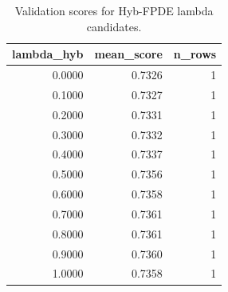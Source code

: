 \begin{table}[t]
\caption{Validation scores for Hyb-FPDE lambda candidates.}
\label{tab:lambda_distribution_computed}
\centering
\begin{tabular}{rrr}
\toprule
lambda\_hyb & mean\_score & n\_rows \\
\midrule
0.0000 & 0.7326 & 1 \\
0.1000 & 0.7327 & 1 \\
0.2000 & 0.7331 & 1 \\
0.3000 & 0.7332 & 1 \\
0.4000 & 0.7337 & 1 \\
0.5000 & 0.7356 & 1 \\
0.6000 & 0.7358 & 1 \\
0.7000 & 0.7361 & 1 \\
0.8000 & 0.7361 & 1 \\
0.9000 & 0.7360 & 1 \\
1.0000 & 0.7358 & 1 \\
\bottomrule
\end{tabular}

\end{table}
